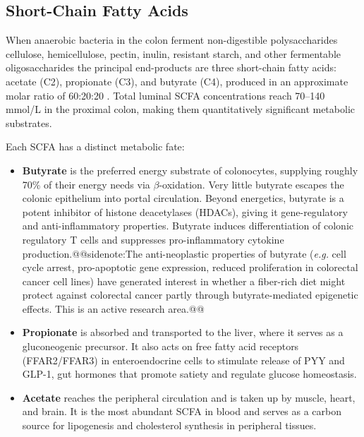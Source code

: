 \documentclass{tufte-handout}
\makeatletter
\def\sidenote#1{@@sidenote:#1@@}
\makeatother
\begin{document}
\subsection{Short-Chain Fatty Acids}

When anaerobic bacteria in the colon ferment non-digestible polysaccharides cellulose, hemicellulose, pectin, inulin, resistant starch, and other fermentable oligosaccharides the principal end-products are three short-chain fatty acids: acetate (C2), propionate (C3), and butyrate (C4), produced in an approximate molar ratio of 60:20:20 \citep{cummingsShortChainFatty1981}. Total luminal SCFA concentrations reach 70--140\,mmol/L in the proximal colon, making them quantitatively significant metabolic substrates.

Each SCFA has a distinct metabolic fate:

\begin{itemize}
  \item \textbf{Butyrate} is the preferred energy substrate of colonocytes, supplying roughly 70\% of their energy needs via $\beta$-oxidation. Very little butyrate escapes the colonic epithelium into portal circulation. Beyond energetics, butyrate is a potent inhibitor of histone deacetylases (HDACs), giving it gene-regulatory and anti-inflammatory properties. Butyrate induces differentiation of colonic regulatory T cells and suppresses pro-inflammatory cytokine production.\sidenote{The anti-neoplastic properties of butyrate (\textit{e.g.} cell cycle arrest, pro-apoptotic gene expression, reduced proliferation in colorectal cancer cell lines) have generated interest in whether a fiber-rich diet might protect against colorectal cancer partly through butyrate-mediated epigenetic effects. This is an active research area.}
  \item \textbf{Propionate} is absorbed and transported to the liver, where it serves as a gluconeogenic precursor. It also acts on free fatty acid receptors (FFAR2/FFAR3) in enteroendocrine cells to stimulate release of PYY and GLP-1, gut hormones that promote satiety and regulate glucose homeostasis.
  \item \textbf{Acetate} reaches the peripheral circulation and is taken up by muscle, heart, and brain. It is the most abundant SCFA in blood and serves as a carbon source for lipogenesis and cholesterol synthesis in peripheral tissues.
\end{itemize}
\end{document}
